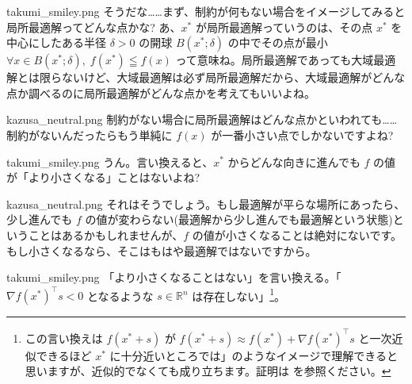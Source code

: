 \documentclass[b5paper,xelatex,ja=standard,10pt]{bxjsarticle}
\begin{document}
\begin{SERIFU}[colback=PaleGold, colbacktitle=PaleGold2]{takumi_smiley.png}
そうだな……まず、制約が何もない場合をイメージしてみると局所最適解ってどんな点かな? あ、$x^\ast$ が局所最適解っていうのは、その点 $x^\ast$ を中心にしたある半径 $\delta > 0$ の開球 $ B(x^\ast; \delta)$ の中でその点が最小 $ \forall x \in B(x^\ast; \delta), \; f(x^\ast) \leqq f(x)$ って意味ね。局所最適解であっても大域最適解とは限らないけど、大域最適解は必ず局所最適解だから、大域最適解がどんな点か調べるのに局所最適解がどんな点かを考えてもいいよね。
\end{SERIFU}

\begin{SERIFU}[colback=PaleIris, colbacktitle=PaleIris2]{kazusa_neutral.png}
制約がない場合に局所最適解はどんな点かといわれても……制約がないんだったらもう単純に $f(x)$ が一番小さい点でしかないですよね?
\end{SERIFU}

\begin{SERIFU}[colback=PaleGold, colbacktitle=PaleGold2]{takumi_smiley.png}
うん。言い換えると、$x^\ast$ からどんな向きに進んでも $f$ の値が「より小さくなる」ことはないよね?
\end{SERIFU}

\begin{SERIFU}[colback=PaleIris, colbacktitle=PaleIris2]{kazusa_neutral.png}
それはそうでしょう。もし最適解が平らな場所にあったら、少し進んでも $f$ の値が変わらない(最適解から少し進んでも最適解という状態)ということはあるかもしれませんが、$f$ の値が小さくなることは絶対にないです。もし小さくなるなら、そこはもはや最適解ではないですから。
\end{SERIFU}

\begin{SERIFU}[colback=PaleGold, colbacktitle=PaleGold2]{takumi_smiley.png}
「より小さくなることはない」を言い換える。「 $ \nabla f(x^\ast)^\top s < 0$ となるような $s \in \mathbb{R}^n$ は存在しない」\footnote{この言い換えは $f(x^\ast + s)$ が $f(x^\ast + s) \approx f(x^\ast) + \nabla f(x^\ast)^\top s$ と一次近似できるほど $x^\ast$ に十分近いところでは」のようなイメージで理解できると思いますが、近似的でなくても成り立ちます。証明は \cite{zenn} を参照ください。}。
\end{SERIFU}
\end{document}
